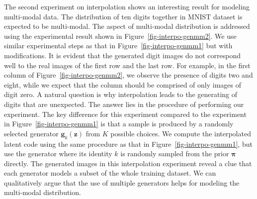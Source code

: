 The second experiment on interpolation shows an interesting result for
modeling multi-modal data. The distribution of ten digits together in
MNIST dataset is expected to be multi-modal. The aspect of multi-modal
distribution is addressed using the experimental result shown in
Figure~\ref{fig-interpo-genmm2}. We use similar experimental steps
as that in Figure~\ref{fig-interpo-genmm1} but with modifications. It
is evident that the generated digit images do not correspond well to
the real images of the first row and the last row. For example, in the
first column of Figure~\ref{fig-interpo-genmm2}, we observe
the presence of digits two and eight, while we expect that the
column should be comprised of only images of digit zero. A natural
question is why interpolation leads to the generating of digits that are
unexpected. The answer lies in the procedure of performing our
experiment. The key difference for this experiment compared to the
experiment in Figure~\ref{fig-interpo-genmm1} is that a sample is
produced by a randomly selected generator $\bm{g}_k(\bm{z})$ from $K$
possible choices. We compute the interpolated latent code using the same
procedure as that in Figure~\ref{fig-interpo-genmm1}, but use the generator where its identity $k$ is randomly sampled from the prior $\bm{\pi}$ directly. The generated images in this interpolation experiment reveal a clue that each generator models a subset of the whole training dataset. We can qualitatively argue that the use of multiple generators helps for modeling the multi-modal distribution.  

